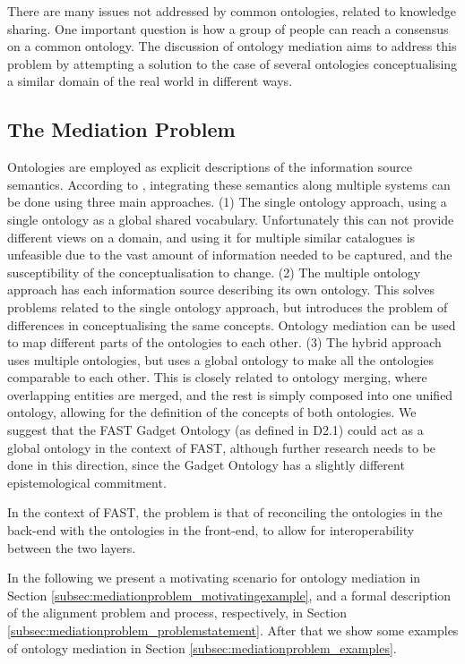 There are many issues not addressed by common ontologies, related to
knowledge sharing. One important question is how a group of people can
reach a consensus on a common ontology. The discussion of ontology
mediation aims to address this problem by attempting a solution to the
case of several ontologies conceptualising a similar domain of the real
world in different ways.


\subsection{The Mediation Problem} %
\label{sec:mediationproblem}
Ontologies are employed as explicit descriptions of the information
source semantics. According to \cite{wache2001ontology_information_integration}, integrating these
semantics along multiple systems can be done using three main
approaches. (1) The single ontology approach, using a single ontology
as a global shared vocabulary. Unfortunately this can not provide
different views on a domain, and using it for multiple similar
catalogues is unfeasible due to the vast amount of information needed
to be captured, and the susceptibility of the conceptualisation to
change. (2) The multiple ontology approach has each information source
describing its own ontology. This solves problems related to the single
ontology approach, but introduces the problem of differences in
conceptualising the same concepts. Ontology mediation can be used to
map different parts of the ontologies to each other. (3) The hybrid
approach uses multiple ontologies, but uses a global ontology to make
all the ontologies comparable to each other. This is closely related to
ontology merging, where overlapping entities are merged, and the rest
is simply composed into one unified ontology, allowing for the
definition of the concepts of both ontologies. We suggest that the FAST
Gadget Ontology (as defined in D2.1) could act as a global ontology in
the context of FAST, although further research needs to be done in this
direction, since the Gadget Ontology has a slightly different
epistemological commitment. 

In the context of FAST, the problem is that of reconciling the
ontologies in the back-end with the ontologies in the front-end, to
allow for interoperability between the two layers. 

In the following we present a motivating scenario for ontology mediation
in Section \ref{subsec:mediationproblem_motivatingexample}, and a formal description of the alignment problem and
process, respectively, in Section \ref{subsec:mediationproblem_problemstatement}. After that we show some examples
of ontology mediation in Section \ref{subsec:mediationproblem_examples}.

